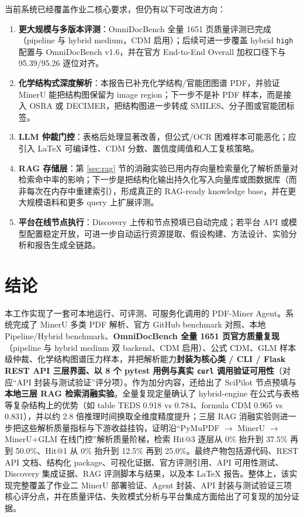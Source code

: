 \documentclass[UTF8,a4paper,11pt]{ctexart}
\begin{document}
当前系统已经覆盖作业二核心要求，但仍有以下可改进方向：
\begin{enumerate}
  \item \textbf{更大规模与多版本评测}：OmniDocBench 全量 1651 页质量评测已完成（pipeline 与 hybrid medium，CDM 启用）；后续可进一步覆盖 hybrid \texttt{high} 配置与 OmniDocBench v1.6，并在官方 End-to-End Overall 加权口径下与 95.39/95.26 逐位对齐。
  \item \textbf{化学结构式深度解析}：本报告已补充化学结构/官能团图谱 PDF，并验证 MinerU 能把结构图保留为 image region；下一步不是补 PDF 样本，而是接入 OSRA 或 DECIMER，把结构图进一步转成 SMILES、分子图或官能团标签。
  \item \textbf{LLM 仲裁门控}：表格后处理显著改善，但公式/OCR 困难样本可能恶化；应引入 LaTeX 可编译性、CDM 分数、置信度阈值和人工复核策略。
  \item \textbf{RAG 存储层}：第 \ref{sec:rag} 节的消融实验已用内存向量检索量化了解析质量对检索命中率的影响；下一步是把结构化输出持久化写入向量库或图数据库（而非每次在内存中重建索引），形成真正的 RAG-ready knowledge base，并在更大规模语料和更多 query 上扩展评测。
  \item \textbf{平台在线节点执行}：Discovery 上传和节点预填已自动完成；若平台 API 或模型配置稳定开放，可进一步自动运行资源提取、假设构建、方法设计、实验分析和报告生成全链路。
\end{enumerate}

\section{结论}

本工作实现了一套可本地运行、可评测、可服务化调用的 PDF-Miner Agent。系统完成了 MinerU 多类 PDF 解析、官方 GitHub benchmark 对照、本地 Pipeline/Hybrid benchmark、\textbf{OmniDocBench 全量 1651 页官方质量复现}（pipeline 与 hybrid medium 双 backend、CDM 启用）、公式 CDM、GLM 样本级仲裁、化学结构图谱压力样本，并把解析能力\textbf{封装为核心类 / CLI / Flask REST API 三层界面、以 8 个 pytest 用例与真实 \texttt{curl} 调用验证可用性}（对应``API 封装与测试验证''评分项）。作为加分内容，还给出了 SciPilot 节点预填与\textbf{本地三层 RAG 检索消融实验}。全量复现定量确认了 hybrid-engine 在公式与表格等复杂结构上的优势（如 table TEDS 0.918 vs 0.784、formula CDM 0.965 vs 0.831），并以约 2.8 倍推理时间换取全维度精度提升；三层 RAG 消融实验则进一步把这些解析质量指标与下游收益挂钩，证明沿``PyMuPDF $\to$ MinerU $\to$ MinerU+GLM 在线门控''解析质量阶梯，检索 Hit@3 逐层从 0\% 抬升到 37.5\% 再到 50.0\%、Hit@1 从 0\% 抬升到 12.5\% 再到 25.0\%。最终产物包括源代码、REST API 文档、结构化 package、可视化证据、官方评测引用、API 可用性测试、Discovery 集成证据、RAG 评测脚本与结果，以及本 LaTeX 报告。整体上，该实现完整覆盖了作业二 MinerU 部署验证、Agent 封装、API 封装与测试验证三项核心评分点，并在质量评估、失败模式分析与平台集成方面给出了可复现的加分证据。
\end{document}
